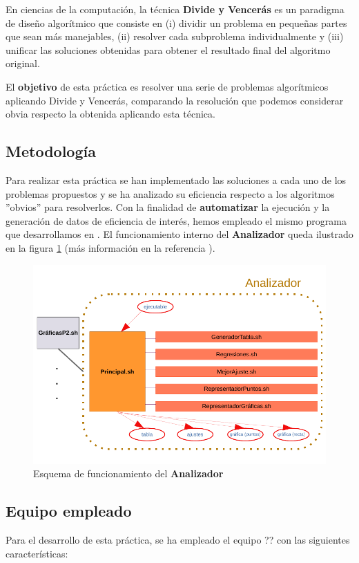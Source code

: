 En ciencias de la computación, la técnica \textbf{Divide y Vencerás} es un paradigma de diseño
algorítmico que consiste en (i) dividir un problema en pequeñas partes que sean más manejables,
(ii) resolver cada subproblema individualmente y (iii) unificar las soluciones obtenidas 
para obtener el resultado final del algoritmo original. 

El \textbf{objetivo} de esta práctica es resolver una serie de problemas algorítmicos aplicando
Divide y Vencerás, comparando la resolución que podemos considerar obvia respecto la obtenida 
aplicando esta técnica. 

\subsection{Metodología}

Para realizar esta práctica se han implementado las soluciones a cada uno de los problemas
propuestos y se ha analizado su eficiencia respecto a los algoritmos ''obvios'' para resolverlos.
Con la finalidad de \textbf{automatizar} la ejecución y la generación de datos de eficiencia
de interés, hemos empleado el mismo programa que desarrollamos en \cite{Rojo2022}.
El funcionamiento interno del \textbf{Analizador} queda ilustrado en la figura 
\ref{fig:analizador} (más información en la referencia \cite{Rojo2022}). 

\begin{figure}[h]
    \centering
    \includegraphics[scale=0.67]{img/esquema_graphkiller.pdf}
    \caption{Esquema de funcionamiento del \textbf{Analizador} \cite{Rojo2022}}
    \label{fig:analizador}
\end{figure}

\subsection{Equipo empleado}

Para el desarrollo de esta práctica, se ha empleado el equipo ?? con las siguientes características: %